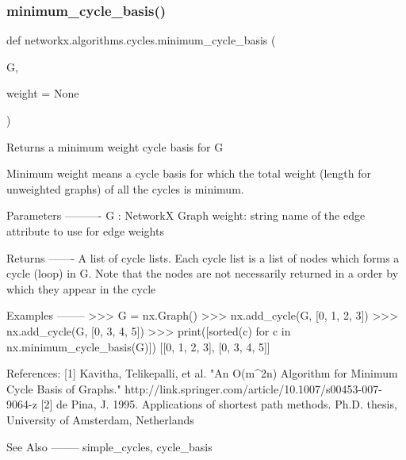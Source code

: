  \mbox{\label{namespacenetworkx_1_1algorithms_1_1cycles_a481131a004cc5e80148f5a9650871650}} 
\subsubsection{\texorpdfstring{minimum\+\_\+cycle\+\_\+basis()}{minimum\_cycle\_basis()}}
{\footnotesize\ttfamily def networkx.\+algorithms.\+cycles.\+minimum\+\_\+cycle\+\_\+basis (\begin{DoxyParamCaption}\item[{}]{G,  }\item[{}]{weight = {\ttfamily None} }\end{DoxyParamCaption})}

\begin{DoxyVerb}Returns a minimum weight cycle basis for G

Minimum weight means a cycle basis for which the total weight
(length for unweighted graphs) of all the cycles is minimum.

Parameters
----------
G : NetworkX Graph
weight: string
    name of the edge attribute to use for edge weights

Returns
-------
A list of cycle lists.  Each cycle list is a list of nodes
which forms a cycle (loop) in G. Note that the nodes are not
necessarily returned in a order by which they appear in the cycle

Examples
--------
>>> G = nx.Graph()
>>> nx.add_cycle(G, [0, 1, 2, 3])
>>> nx.add_cycle(G, [0, 3, 4, 5])
>>> print([sorted(c) for c in nx.minimum_cycle_basis(G)])
[[0, 1, 2, 3], [0, 3, 4, 5]]

References:
    [1] Kavitha, Telikepalli, et al. "An O(m^2n) Algorithm for
    Minimum Cycle Basis of Graphs."
    http://link.springer.com/article/10.1007/s00453-007-9064-z
    [2] de Pina, J. 1995. Applications of shortest path methods.
    Ph.D. thesis, University of Amsterdam, Netherlands

See Also
--------
simple_cycles, cycle_basis
\end{DoxyVerb}
 \mbox{\label{namespacenetworkx_1_1algorithms_1_1cycles_ae7bedb7146b5c717fd6489a63bdfefe3}} 
